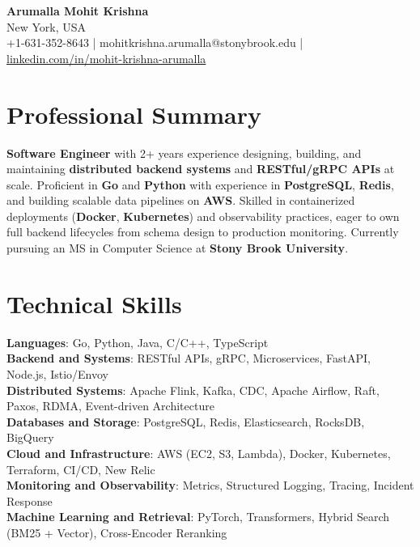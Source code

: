 \documentclass[letterpaper,11pt]{article}
\begin{document}
\begin{center}
  {\Large \textbf{Arumalla Mohit Krishna}} \\
  New York, USA \\
  +1-631-352-8643 \enspace | \enspace mohitkrishna.arumalla@stonybrook.edu \enspace | \enspace \href{https://www.linkedin.com/in/mohit-krishna-arumalla}{linkedin.com/in/mohit-krishna-arumalla}
\end{center}

\section{Professional Summary}
  \begin{itemize}[leftmargin=0.15in, label={}]
    \small{\item{
     \textbf{Software Engineer} with 2+ years experience designing, building, and maintaining \textbf{distributed backend systems} and \textbf{RESTful/gRPC APIs} at scale. Proficient in \textbf{Go} and \textbf{Python} with experience in \textbf{PostgreSQL}, \textbf{Redis}, and building scalable data pipelines on \textbf{AWS}. Skilled in containerized deployments (\textbf{Docker}, \textbf{Kubernetes}) and observability practices, eager to own full backend lifecycles from schema design to production monitoring. Currently pursuing an MS in Computer Science at \textbf{Stony Brook University}.
    }}
  \end{itemize}
\vspace{-16pt}

\section{Technical Skills}
 \begin{itemize}[leftmargin=0.15in, label={}]
    \small{\item{
     \textbf{Languages}: Go, Python, Java, C/C++, TypeScript \\
     \textbf{Backend and Systems}: RESTful APIs, gRPC, Microservices, FastAPI, Node.js, Istio/Envoy \\
     \textbf{Distributed Systems}: Apache Flink, Kafka, CDC, Apache Airflow, Raft, Paxos, RDMA, Event-driven Architecture \\
     \textbf{Databases and Storage}: PostgreSQL, Redis, Elasticsearch, RocksDB, BigQuery \\
     \textbf{Cloud and Infrastructure}: AWS (EC2, S3, Lambda), Docker, Kubernetes, Terraform, CI/CD, New Relic \\
     \textbf{Monitoring and Observability}: Metrics, Structured Logging, Tracing, Incident Response \\
     \textbf{Machine Learning and Retrieval}: PyTorch, Transformers, Hybrid Search (BM25 + Vector), Cross-Encoder Reranking
    }}
 \end{itemize}
\vspace{-16pt}
\end{document}
